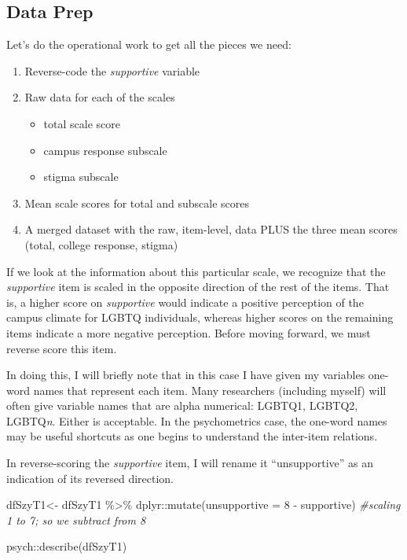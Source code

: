 \documentclass[
  english,
]{book}
\newenvironment{Shaded}{\begin{snugshade}}{\end{snugshade}}
\newcommand{\AttributeTok}[1]{\textcolor[rgb]{0.77,0.63,0.00}{#1}}
\newcommand{\CommentTok}[1]{\textcolor[rgb]{0.56,0.35,0.01}{\textit{#1}}}
\newcommand{\DecValTok}[1]{\textcolor[rgb]{0.00,0.00,0.81}{#1}}
\newcommand{\FunctionTok}[1]{\textcolor[rgb]{0.00,0.00,0.00}{#1}}
\newcommand{\NormalTok}[1]{#1}
\newcommand{\OtherTok}[1]{\textcolor[rgb]{0.56,0.35,0.01}{#1}}
\newcommand{\SpecialCharTok}[1]{\textcolor[rgb]{0.00,0.00,0.00}{#1}}
\providecommand{\tightlist}{%
  \setlength{\itemsep}{0pt}\setlength{\parskip}{0pt}}
\begin{document}
\hypertarget{data-prep}{%
\subsection{Data Prep}\label{data-prep}}

Let's do the operational work to get all the pieces we need:

\begin{enumerate}
\def\labelenumi{\arabic{enumi}.}
\tightlist
\item
  Reverse-code the \emph{supportive} variable
\item
  Raw data for each of the scales

  \begin{itemize}
  \tightlist
  \item
    total scale score
  \item
    campus response subscale
  \item
    stigma subscale
  \end{itemize}
\item
  Mean scale scores for total and subscale scores
\item
  A merged dataset with the raw, item-level, data PLUS the three mean scores (total, college response, stigma)
\end{enumerate}

If we look at the information about this particular scale, we recognize that the \emph{supportive} item is scaled in the opposite direction of the rest of the items. That is, a higher score on \emph{supportive} would indicate a positive perception of the campus climate for LGBTQ individuals, whereas higher scores on the remaining items indicate a more negative perception. Before moving forward, we must reverse score this item.

In doing this, I will briefly note that in this case I have given my variables one-word names that represent each item. Many researchers (including myself) will often give variable names that are alpha numerical: LGBTQ1, LGBTQ2, LGBTQ\emph{n}. Either is acceptable. In the psychometrics case, the one-word names may be useful shortcuts as one begins to understand the inter-item relations.

In reverse-scoring the \emph{supportive} item, I will rename it ``unsupportive'' as an indication of its reversed direction.

\begin{Shaded}
\begin{Highlighting}[]
\NormalTok{dfSzyT1}\OtherTok{\textless{}{-}}\NormalTok{ dfSzyT1 }\SpecialCharTok{\%\textgreater{}\%}
\NormalTok{  dplyr}\SpecialCharTok{::}\FunctionTok{mutate}\NormalTok{(}\AttributeTok{unsupportive =} \DecValTok{8} \SpecialCharTok{{-}}\NormalTok{ supportive) }\CommentTok{\#scaling 1 to 7; so we subtract from 8}

\NormalTok{psych}\SpecialCharTok{::}\FunctionTok{describe}\NormalTok{(dfSzyT1)}
\end{Highlighting}
\end{Shaded}
\end{document}
